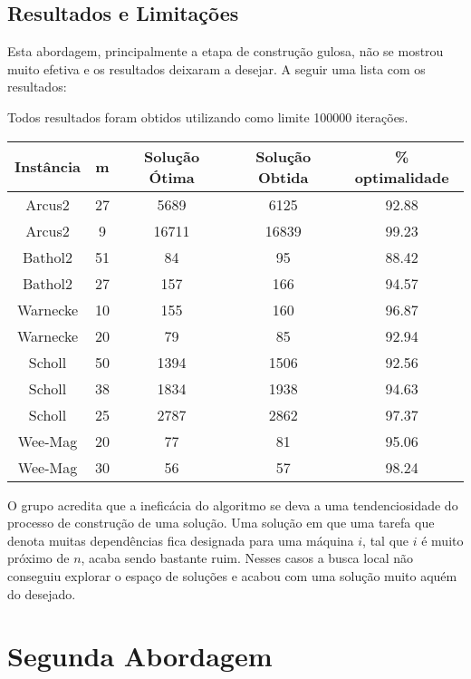 \documentclass{report}
\begin{document}
\subsection{Resultados e Limitações}

Esta abordagem, principalmente a etapa de construção gulosa, não se mostrou muito
efetiva e os resultados deixaram a desejar. A seguir uma lista com os resultados:

Todos resultados foram obtidos utilizando como limite 100000 iterações.

\begin{table}[htbp]
 \begin{tabular}{|c|c|c|c|c|}
  \hline
  \textbf{Instância} & \textbf{m} & \textbf{Solução Ótima} & \textbf{Solução Obtida} & \% optimalidade \\
  \hline
  Arcus2 & 27 & 5689 & 6125 & 92.88 \\
  \hline
  Arcus2 & 9 & 16711 & 16839 & 99.23 \\
  \hline
  Bathol2 & 51 & 84 & 95 & 88.42 \\
  \hline
  Bathol2 & 27 & 157 & 166 & 94.57 \\
  \hline
  Warnecke & 10 & 155 & 160 & 96.87 \\
  \hline
  Warnecke & 20 & 79 & 85 & 92.94 \\
  \hline
  Scholl & 50 & 1394 & 1506 & 92.56 \\
  \hline
  Scholl & 38 & 1834 & 1938 & 94.63 \\
  \hline
  Scholl & 25 & 2787 & 2862 & 97.37 \\
  \hline
  Wee-Mag & 20 & 77 & 81 & 95.06 \\
  \hline
  Wee-Mag & 30 & 56 & 57 & 98.24 \\
  \hline
 \end{tabular}
\end{table}

O grupo acredita que a ineficácia do algoritmo se deva a uma tendenciosidade do
processo de construção de uma solução. Uma solução em que uma tarefa que denota
muitas dependências fica designada para uma máquina $i$, tal que $i$ é muito
próximo de $n$, acaba sendo bastante ruim. Nesses casos a busca local não
conseguiu explorar o espaço de soluções e acabou com uma solução muito aquém
do desejado.

\section{Segunda Abordagem}
\end{document}

